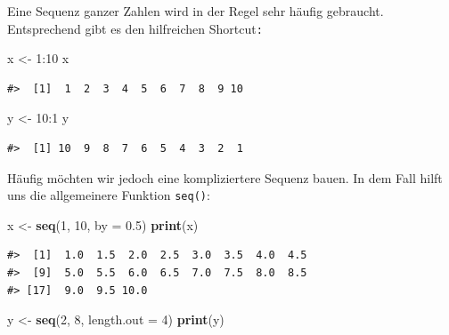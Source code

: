 \documentclass[]{tufte-book}
\newenvironment{Shaded}{}{}
\newcommand{\KeywordTok}[1]{\textcolor[rgb]{0.00,0.44,0.13}{\textbf{#1}}}
\newcommand{\DataTypeTok}[1]{\textcolor[rgb]{0.56,0.13,0.00}{#1}}
\newcommand{\DecValTok}[1]{\textcolor[rgb]{0.25,0.63,0.44}{#1}}
\newcommand{\FloatTok}[1]{\textcolor[rgb]{0.25,0.63,0.44}{#1}}
\newcommand{\StringTok}[1]{\textcolor[rgb]{0.25,0.44,0.63}{#1}}
\newcommand{\OperatorTok}[1]{\textcolor[rgb]{0.40,0.40,0.40}{#1}}
\newcommand{\NormalTok}[1]{#1}
\begin{document}
Eine Sequenz ganzer Zahlen wird in der Regel sehr häufig gebraucht.
Entsprechend gibt es den hilfreichen Shortcut\texttt{:}

\begin{Shaded}
\begin{Highlighting}[]
\NormalTok{x <-}\StringTok{ }\DecValTok{1}\OperatorTok{:}\DecValTok{10}
\NormalTok{x}
\end{Highlighting}
\end{Shaded}

\begin{verbatim}
#>  [1]  1  2  3  4  5  6  7  8  9 10
\end{verbatim}

\begin{Shaded}
\begin{Highlighting}[]
\NormalTok{y <-}\StringTok{ }\DecValTok{10}\OperatorTok{:}\DecValTok{1}
\NormalTok{y}
\end{Highlighting}
\end{Shaded}

\begin{verbatim}
#>  [1] 10  9  8  7  6  5  4  3  2  1
\end{verbatim}

Häufig möchten wir jedoch eine kompliziertere Sequenz bauen. In dem Fall
hilft uns die allgemeinere Funktion \texttt{seq()}:

\begin{Shaded}
\begin{Highlighting}[]
\NormalTok{x <-}\StringTok{ }\KeywordTok{seq}\NormalTok{(}\DecValTok{1}\NormalTok{, }\DecValTok{10}\NormalTok{, }\DataTypeTok{by =} \FloatTok{0.5}\NormalTok{)}
\KeywordTok{print}\NormalTok{(x)}
\end{Highlighting}
\end{Shaded}

\begin{verbatim}
#>  [1]  1.0  1.5  2.0  2.5  3.0  3.5  4.0  4.5
#>  [9]  5.0  5.5  6.0  6.5  7.0  7.5  8.0  8.5
#> [17]  9.0  9.5 10.0
\end{verbatim}

\begin{Shaded}
\begin{Highlighting}[]
\NormalTok{y <-}\StringTok{ }\KeywordTok{seq}\NormalTok{(}\DecValTok{2}\NormalTok{, }\DecValTok{8}\NormalTok{, }\DataTypeTok{length.out =} \DecValTok{4}\NormalTok{)}
\KeywordTok{print}\NormalTok{(y)}
\end{Highlighting}
\end{Shaded}
\end{document}
